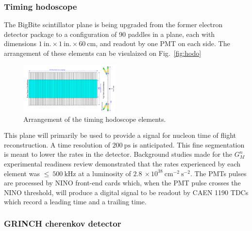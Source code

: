 \subsubsection{Timing hodoscope}

The BigBite scintillator plane is being upgraded from the former electron detector package to a configuration of 90 paddles in a plane, each with dimensions $1~\mathrm{in.}\times1~\mathrm{in.}\times60~\mathrm{cm}$, and readout by one PMT on each side.
The arrangement of these elements can be visulaized on Fig.~\ref{fig:hodo}
%
\begin{figure}[!h]
  \begin{center}
    \includegraphics[angle=-90,width=5cm]{Plots/Hodo.png}
    \caption{Arrangement of the timing hodoscope elements.}
    \label{fig:grinch}
  \end{center}
\end{figure}
%
This plane will primarily be used to provide a signal for nucleon time of flight reconstruction. A time resolution of $200~\mathrm{ps}$ is anticipated.
This fine segmentation is meant to lower the rates in the detector. Background studies made for the $G_M^n$ experimental readiness review \cite{gmn_err} demonstrated that the rates experienced by each element was $\leq~500~\mathrm{kHz}$ at a luminosity of $2.8~\times10^{38}~\mathrm{cm}^{-2}~\mathrm{s}^{-2}$. %
The PMTs pulses are processed by NINO front-end cards which, when the PMT pulse crosses the NINO threshold, will produce a digital signal to be readout by CAEN 1190 TDCs which record a leading time and a trailing time.

\subsubsection{GRINCH cherenkov detector}

